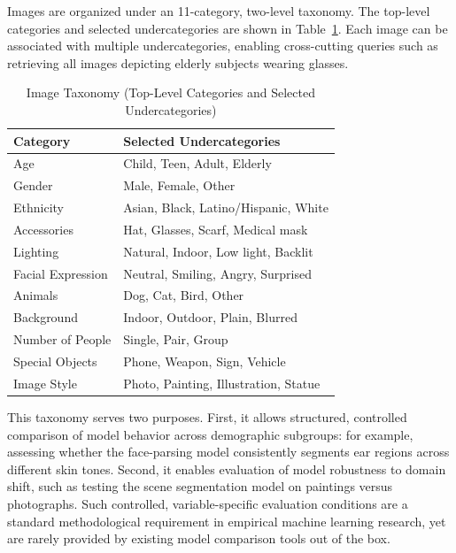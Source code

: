 \documentclass[conference,a4paper,flushend]{iaria}
\begin{document}
Images are organized under an 11-category, two-level taxonomy. The top-level categories and selected undercategories are shown in Table~\ref{tab:taxonomy}. Each image can be associated with multiple undercategories, enabling cross-cutting queries such as retrieving all images depicting elderly subjects wearing glasses.

\begin{table}[htbp]
\caption{Image Taxonomy (Top-Level Categories and Selected Undercategories)}
\label{tab:taxonomy}
{\small\setlength{\tabcolsep}{4pt}\setcellgapes{4pt}\makegapedcells
\begin{tabular}{| l | l |}
\hline
\textbf{Category} & \textbf{Selected Undercategories} \\
\hline
Age              & Child, Teen, Adult, Elderly \\
\hline
Gender           & Male, Female, Other \\
\hline
Ethnicity & Asian, Black, Latino/Hispanic, White \\
\hline
Accessories      & Hat, Glasses, Scarf, Medical mask \\
\hline
Lighting         & Natural, Indoor, Low light, Backlit \\
\hline
Facial Expression & Neutral, Smiling, Angry, Surprised \\
\hline
Animals          & Dog, Cat, Bird, Other \\
\hline
Background       & Indoor, Outdoor, Plain, Blurred \\
\hline
Number of People & Single, Pair, Group \\
\hline
Special Objects  & Phone, Weapon, Sign, Vehicle \\
\hline
Image Style      & Photo, Painting, Illustration, Statue \\
\hline
\end{tabular}
}
\end{table}

This taxonomy serves two purposes. First, it allows structured, controlled comparison of model behavior across demographic subgroups: for example, assessing whether the face-parsing model consistently segments ear regions across different skin tones. Second, it enables evaluation of model robustness to domain shift, such as testing the scene segmentation model on paintings versus photographs. Such controlled, variable-specific evaluation conditions are a standard methodological requirement in empirical machine learning research, yet are rarely provided by existing model comparison tools out of the box.
\end{document}
